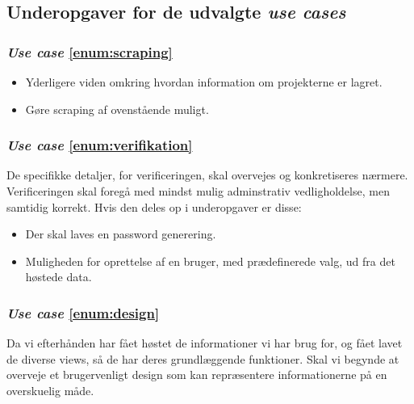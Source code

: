 \documentclass[11pt]{article}
\begin{document}
\subsection{Underopgaver for de udvalgte \textit{use cases}}
\subsubsection*{\textit{Use case} \ref{enum:scraping}}
\begin{itemize}
	\item Yderligere viden omkring hvordan information om projekterne er lagret.
	\item Gøre scraping af ovenstående muligt.
\end{itemize}

\subsubsection*{\textit{Use case} \ref{enum:verifikation}}
De specifikke detaljer, for verificeringen, skal overvejes og konkretiseres nærmere. Verificeringen skal foregå med mindst mulig adminstrativ vedligholdelse, men samtidig korrekt. Hvis den deles op i underopgaver er disse:
\begin{itemize}
	\item Der skal laves en password generering.
	\item Muligheden for oprettelse af en bruger, med prædefinerede valg, ud fra det høstede data.
\end{itemize}

\subsubsection*{\textit{Use case} \ref{enum:design}}
Da vi efterhånden har fået høstet de informationer vi har brug for, og fået lavet de diverse views, så de har deres grundlæggende funktioner. Skal vi begynde at overveje et brugervenligt design som kan repræsentere informationerne på en overskuelig måde.
\end{document}
